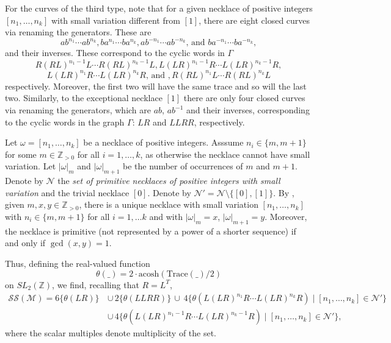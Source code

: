 \documentclass[12pt,reqno]{amsart}
\numberwithin{equation}{part}
\theoremstyle{plain}
\theoremstyle{definition}
\newcommand{\ZZ}{\mathbb{Z}}
\begin{document}
For the curves of the third type, note that for a given necklace of positive integers $[n_1,\hdots, n_k]$ with small variation different from $[1]$, there are eight closed curves via renaming the generators. These are \[ab^{n_1}\cdots ab^{n_k}, ba^{n_1}\cdots ba^{n_k}, ab^{-n_1}\cdots ab^{-n_k}\text{, and }ba^{-n_1}\cdots ba^{-n_k},\] and their inverses. These correspond to the cyclic words in $\Gamma$ \[R(RL)^{n_1-1}L\cdots R(RL)^{n_k-1}L, L(LR)^{n_1-1}R\cdots L(LR)^{n_k-1}R,\] \[ L(LR)^{n_1}R\cdots L(LR)^{n_k}R\text{, and },R(RL)^{n_1}L\cdots R(RL)^{n_k}L\] respectively. Moreover, the first two will have the same trace and so will the last two. Similarly, to the exceptional necklace $[1]$ there are only four closed curves via renaming the generators, which are $ab$, $ab^{-1}$ and their inverses, corresponding to the cyclic words in the graph $\Gamma$: $LR$ and $LLRR$, respectively.

 Let $\omega=[n_1,\hdots, n_k]$ be a necklace of positive integers. Asssume $n_i\in\{m,m+1\}$ for some $m\in \ZZ_{>0}$ for all $i=1,\hdots, k$, as otherwise the necklace cannot have small variation. Let $|\omega|_m$ and $|\omega|_{m+1}$ be the number of occurrences of $m$ and $m+1$. Denote by $\mathcal{N}$ the \emph{set of primitive necklaces of positive integers with small variation} and the trivial necklace $[0]$. Denote by $\mathcal{N}'=\mathcal{N}\setminus\{[0],[1]\}$. By \cite[Proposition~2.8]{FL24}, given $m,x,y\in \ZZ_{>0}$, there is a unique necklace with small variation $[n_1,\hdots,n_k]$ with $n_i\in \{m,m+1\}$ for all $i=1,\dots k$ and with $|\omega|_m=x$, $|\omega|_{m+1}=y$. Moreover, the necklace is primitive (not represented by a power of a shorter sequence) if and only if $\gcd(x,y)=1$.

Thus, defining the real-valued function \begin{equation}\label{eq:theta}\theta(\_)=2\cdot \mathrm{acosh}(\mathrm{Trace}(\_)/2)\end{equation} on $SL_2(\ZZ)$, we find, recalling that $R = L^T$,
\begin{align*}
\mathcal{SS}(\mathcal{M})=6\{\theta(LR)\}\,&\cup\,2\{\theta(LLRR)\}\,\cup\,4\{\theta(L(LR)^{n_1}R\cdots L(LR)^{n_k}R)\mid [n_1,\hdots, n_k]\in\mathcal{N}'\}\\&\cup\,4\{\theta(L(LR)^{n_1-1}R\cdots L(LR)^{n_k-1}R)\mid [n_1,\hdots, n_k]\in\mathcal{N}'\},
\end{align*}
where the scalar multiples denote multiplicity of the set.
\end{document}
